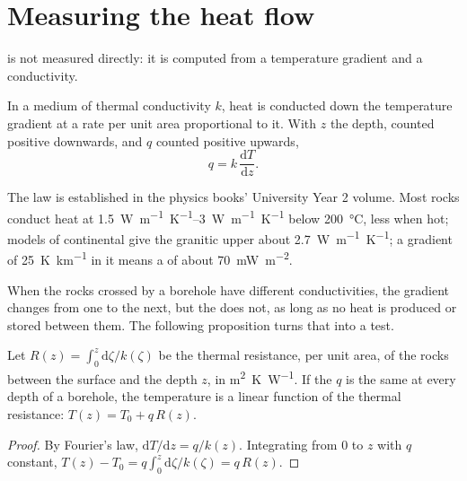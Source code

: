 \section{Measuring the heat flow}

 is not measured directly: it is computed from a temperature gradient
and a conductivity.

\begin{proposition}\label{prop:b1:heat-budget:fourier}
In a medium of thermal conductivity $k$, heat is conducted down the
temperature gradient at a rate per unit area proportional to it. With $z$ the
depth, counted positive downwards, and $q$ counted positive upwards,
\[
  q = k\,\frac{\mathrm dT}{\mathrm dz} .
\]
\end{proposition}
\admitted

The law is established in the physics books' University Year 2 volume. Most
rocks conduct heat at \qtyrange{1.5}{3}{W.m^{-1}.K^{-1}} below
\qty{200}{\celsius}, less when hot; models of continental  give the
granitic upper  about \qty{2.7}{W.m^{-1}.K^{-1}};
a gradient of \qty{25}{K.km^{-1}} in it means a  of about
\qty{70}{mW.m^{-2}}.

When the rocks crossed by a borehole have different conductivities, the
gradient changes from one to the next, but the  does not, as long as
no heat is produced or stored between them. The following proposition turns
that into a test.

\begin{proposition}\label{prop:b1:heat-budget:bullard}
Let $R(z) = \int_0^z \mathrm d\zeta/k(\zeta)$ be the thermal resistance, per
unit area, of the rocks between the surface and the depth $z$, in
\unit{m^2.K.W^{-1}}. If the  $q$ is the same at every depth of a
borehole, the temperature is a linear function of the thermal resistance:
$T(z) = T_0 + q\,R(z)$.
\end{proposition}

\begin{proof}
By Fourier's law, $\mathrm dT/\mathrm dz = q/k(z)$. Integrating from $0$ to
$z$ with $q$ constant, $T(z) - T_0 = q\int_0^z \mathrm d\zeta/k(\zeta) = q\,R(z)$.
\end{proof}

